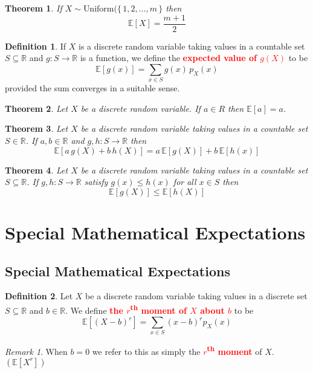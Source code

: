 \documentclass{article}
\newcommand{\R}{\mathbb{R}}
\newcommand{\E}{\mathbb{E}}
\newcommand{\bfred}[1]{\textcolor{red}{\textbf{#1}}}
\theoremstyle{plain}
\newtheorem{thm}{Theorem}[section]
\theoremstyle{definition}
\newtheorem{defn}{Definition}[section]
\theoremstyle{remark}
\newtheorem*{rem}{Remark}
\begin{document}
\begin{thm}
    If $X \sim \text{Uniform}(\{\,1,2, \dotsc, m\,\}$ then \[\E[X] = \frac{m+1}{2}\]
\end{thm}

\begin{defn}
    If $X$ is a discrete random variable taking values in a countable set $S \subseteq \R$ and $g: S \rightarrow \R$ is a function, we define the \bfred{expected value of $g(X)$} to be \[\E[g(x)] = \sum_{x \in S}g(x)\,p_X(x)\] provided the sum converges in a suitable sense.
\end{defn}

\begin{thm}
    Let $X$ be a discrete random variable. If $a \in R$ then $\E[a] = a$.
\end{thm}

\begin{thm}
    Let $X$ be a discrete random variable taking values in a countable set $S \in \R$. If $a, b \in \R$ and $g, h: S \rightarrow \R$ then \[\E[a\,g(X) + b\,h(X)] = a\,\E[g(X)] + b\,\E[h(x)]\]
\end{thm}

\begin{thm}
    Let $X$ be a discrete random variable taking values in a countable set $S \subseteq \R$. If $g, h: S \rightarrow \R$ satisfy $g(x) \leq h(x)$ for all $x \in S$ then \[\E[g(X)] \leq \E[h(X)]\]
\end{thm}

\section{Special Mathematical Expectations}

\subsection{Special Mathematical Expectations}

\begin{defn}
    Let $X$ be a discrete random variable taking values in a discrete set $S \subseteq \R$ and $b \in \R$. We define \bfred{the $r$\textsuperscript{th} moment of $X$ about $b$} to be \[\E[(X-b)^r] = \sum_{x \in S}(x-b)^rp_X(x)\]
\end{defn}

\begin{rem}
    When $b = 0$ we refer to this as simply the \bfred{$r$\textsuperscript{th} moment} of $X$. $(\E[X^r])$
\end{rem}
\end{document}
